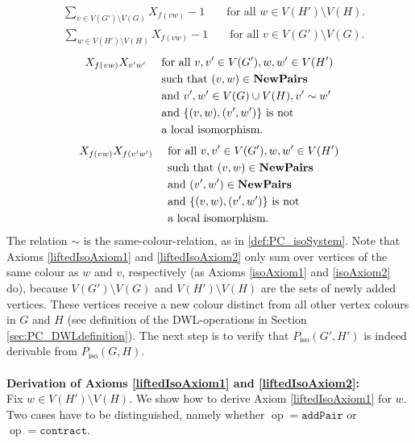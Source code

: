 \documentclass[10pt,a4paper]{article}
\newcommand{\Pairs}{\text{\upshape \textbf{NewPairs}}}
\newcommand{\pairOp }{\texttt{addPair}}
\newcommand{\sccOp }{\texttt{contract}}
\newcommand{\op}{\operatorname{op}}
\newcommand{\Piso}{P_{\text{iso}}}
\begin{document}
	\begin{align}
		\label{liftedIsoAxiom1}
		&\sum_{v \in V(G') \setminus V(G)} X_{f(vw)} - 1 & &\text{ for all } w \in V(H') \setminus V(H).
	\end{align}
	\begin{align}
		\label{liftedIsoAxiom2}
		&\sum_{w \in V(H') \setminus V(H)} X_{f(vw)} - 1 & &\text{ for all } v \in V(G') \setminus V(G).
	\end{align}
	\begin{align}
		\label{liftedIsoAxiom3}
		&X_{f(vw)}X_{v'w'} & &\text{ for all } v,v' \in V(G'), w,w' \in V(H')\\
		& & &\text{ such that } (v,w) \in \Pairs  \notag\\
		& & &\text{ and } v', w' \in V(G) \cup V(H), v' \sim w' \notag\\ 
		& & &\text{ and } \{(v,w),(v',w')\} \text{ is not} \notag\\
		& & & \text{ a local isomorphism.} \notag
	\end{align}
	\begin{align}
		\label{liftedIsoAxiom4}
		&X_{f(vw)}X_{f(v'w')} & &\text{ for all } v,v' \in V(G'), w,w' \in V(H')\\
		& & &\text{ such that } (v,w) \in \Pairs \notag\\
		& & &\text{ and } (v',w') \in \Pairs \notag\\ 
		& & &\text{ and } \{(v,w),(v',w')\} \text{ is not} \notag\\
		& & & \text{ a local isomorphism.} \notag
	\end{align}
	The relation $\sim$ is the same-colour-relation, as in \autoref{def:PC_isoSystem}. Note that Axioms \eqref{liftedIsoAxiom1} and \eqref{liftedIsoAxiom2} only sum over vertices of the same colour as $w$ and $v$, respectively (as Axioms \eqref{isoAxiom1} and \eqref{isoAxiom2} do), because $V(G') \setminus V(G)$ and $V(H') \setminus V(H)$ are the sets of newly added vertices. These vertices receive a new colour distinct from all other vertex colours in $G$ and $H$ (see definition of the DWL-operations in Section \ref{sec:PC_DWLdefinition}). 
	The next step is to verify that $\Piso(G',H')$ is indeed derivable from $\Piso(G,H)$.\\
	\\
	\textbf{Derivation of Axioms \eqref{liftedIsoAxiom1} and \eqref{liftedIsoAxiom2}:}\\
	Fix $w \in V(H') \setminus V(H)$. We show how to derive Axiom \eqref{liftedIsoAxiom1} for $w$.
	Two cases have to be distinguished, namely whether $\op = \pairOp$ or $\op= \sccOp$.\\
\end{document}
